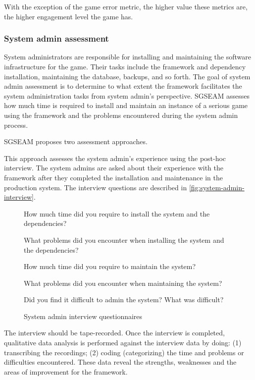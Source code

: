With the exception of the game error metric, the higher value these metrics are, the higher engagement 
level the game has.

\subsubsection{System admin assessment}

System administrators are responsible for installing and maintaining the software infrastructure
for the game. Their tasks include the framework and dependency installation, maintaining the database, 
backups, and so forth. The goal of system admin assessment is to determine to what extent the 
framework facilitates the system administration tasks from system admin's perspective. SGSEAM 
assesses how much time is required to install and maintain an instance of a serious game using the 
framework and the problems encountered  during the system admin process.
 
SGSEAM proposes two assessment approaches.

\label{Post-hoc system admin interview}

This approach assesses the system admin's experience using the post-hoc interview. The system admins 
are asked about their experience with the framework after they completed the installation and maintenance
 in the production system. The interview questions are described in \autoref{fig:system-admin-interview}.

\begin{figure}[ht!]
\begin{mybox}
\begin{compactenum}
\item How much time did you require to install the system and the dependencies?
\item What problems did you encounter when installing the system and the dependencies?
\item How much time did you require to maintain the system?
\item What problems did you encounter when maintaining the system?
\item Did you find it difficult to admin the system? What was difficult?
\end{compactenum}
\end{mybox}
\caption{System admin interview questionnaires}
\label{fig:system-admin-interview}  
\end{figure}

The interview should be tape-recorded. Once the interview is completed, qualitative data
analysis is performed against the interview data by doing: (1) transcribing the recordings; 
(2) coding (categorizing) the time and problems or difficulties encountered. These data reveal the 
strengths, weaknesses and the areas of improvement for the framework.

